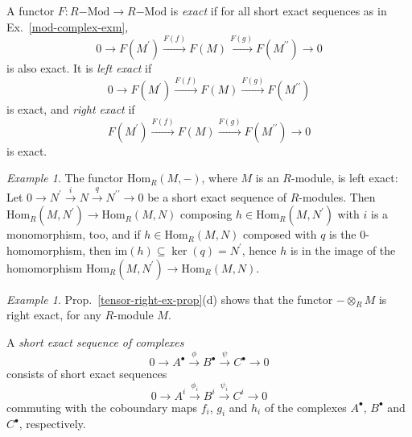 \documentclass{amsart}
\theoremstyle{plain}
\numberwithin{equation}{section} %
\numberwithin{figure}{section} %
\theoremstyle{plain}
\theoremstyle{plain}
\theoremstyle{plain}
\theoremstyle{plain}
\theoremstyle{plain}
\theoremstyle{plain}
\theoremstyle{remark}
\theoremstyle{remark}
\theoremstyle{remark}
\newtheorem{exm}[thm]{Example}
\begin{document}
A functor $F: R\mathrm{-Mod} \rightarrow R\mathrm{-Mod}$ is \textit{exact} if for all short exact sequences as in Ex.~\ref{mod-complex-exm},
\[ 0 \rightarrow F(M^\prime) \stackrel{F(f)}{\rightarrow} F(M) \stackrel{F(g)}{\rightarrow} F(M^{\prime\prime}) \rightarrow 0 \]
is also exact. It is \textit{left exact} if
\[ 0 \rightarrow F(M^\prime) \stackrel{F(f)}{\rightarrow} F(M) \stackrel{F(g)}{\rightarrow} F(M^{\prime\prime}) \]
is exact, and \textit{right exact} if
\[ F(M^\prime) \stackrel{F(f)}{\rightarrow} F(M) \stackrel{F(g)}{\rightarrow} F(M^{\prime\prime}) \rightarrow 0 \]
is exact.

\begin{exm} \label{hom-left-ex-ex}
The functor $\mathrm{Hom}_R(M, -)$, where $M$ is an $R$-module, is left exact: Let $0 \rightarrow N^\prime \stackrel{i}{\rightarrow} N \stackrel{q}{\rightarrow} N^{\prime\prime} \rightarrow 0$ be a short exact sequence of $R$-modules. Then $\mathrm{Hom}_R(M, N^\prime) \rightarrow \mathrm{Hom}_R(M, N)$ composing $h \in \mathrm{Hom}_R(M, N^\prime)$ with $i$ is a monomorphism, too, and if $h \in \mathrm{Hom}_R(M, N)$ composed with $q$ is the 0-homomorphism, then $\mathrm{im}(h) \subseteq \ker(q) = N^\prime$, hence $h$ is in the image of the homomorphism $\mathrm{Hom}_R(M, N^\prime) \rightarrow \mathrm{Hom}_R(M, N)$. 
\end{exm}

\begin{exm} \label{tensor-right-ex-ex}
Prop.~\ref{tensor-right-ex-prop}(d) shows that the functor $- \otimes_R M$ is right exact, for any $R$-module $M$.
\end{exm}

A \textit{short exact sequence of complexes}
\[ 0 \rightarrow A^\bullet \stackrel{\phi}{\rightarrow} B^\bullet \stackrel{\psi}{\rightarrow} C^\bullet \rightarrow 0 \]
consists of short exact sequences
\[ 0 \rightarrow A^i \stackrel{\phi_i}{\rightarrow} B^i \stackrel{\psi_i}{\rightarrow} C^i \rightarrow 0 \]
commuting with the coboundary maps $f_i$, $g_i$ and $h_i$ of the complexes $A^\bullet$, $B^\bullet$ and $C^\bullet$, respectively.
\end{document}
